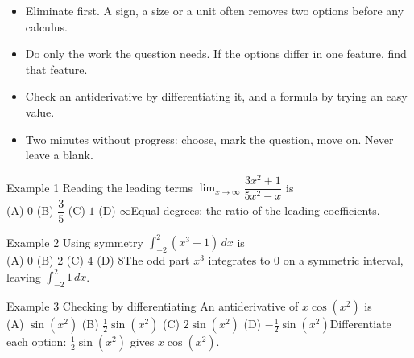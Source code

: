 \documentclass[11pt]{article}
\begin{document}

\begin{ideabox}
\begin{itemize}[leftmargin=*,itemsep=2pt,topsep=2pt]
  \item Eliminate first. A sign, a size or a unit often removes two options before any calculus.
  \item Do only the work the question needs. If the options differ in one feature, find that feature.
  \item Check an antiderivative by differentiating it, and a formula by trying an easy value.
  \item Two minutes without progress: choose, mark the question, move on. Never leave a blank.
\end{itemize}
\end{ideabox}

\begin{example}{Example 1 \textperiodcentered{} Reading the leading terms}
$\displaystyle\lim_{x\to\infty}\dfrac{3x^2+1}{5x^2-x}$ is \\[2pt] (A) $0$ \qquad (B) $\dfrac35$ \qquad (C) $1$ \qquad (D) $\infty$\soln Equal degrees: the ratio of the leading coefficients.
\end{example}

\begin{example}{Example 2 \textperiodcentered{} Using symmetry}
$\displaystyle\int_{-2}^{2}(x^3+1)\,dx$ is \\[2pt] (A) $0$ \qquad (B) $2$ \qquad (C) $4$ \qquad (D) $8$\soln The odd part $x^3$ integrates to 0 on a symmetric interval, leaving $\displaystyle\int_{-2}^{2}1\,dx$.
\end{example}

\begin{example}{Example 3 \textperiodcentered{} Checking by differentiating}
An antiderivative of $x\cos\!\left(x^2\right)$ is \\[2pt] (A) $\sin\!\left(x^2\right)$ \qquad (B) $\tfrac12\sin\!\left(x^2\right)$ \qquad (C) $2\sin\!\left(x^2\right)$ \qquad (D) $-\tfrac12\sin\!\left(x^2\right)$\soln Differentiate each option: $\tfrac12\sin\!\left(x^2\right)$ gives $x\cos\!\left(x^2\right)$.
\end{example}
\end{document}
